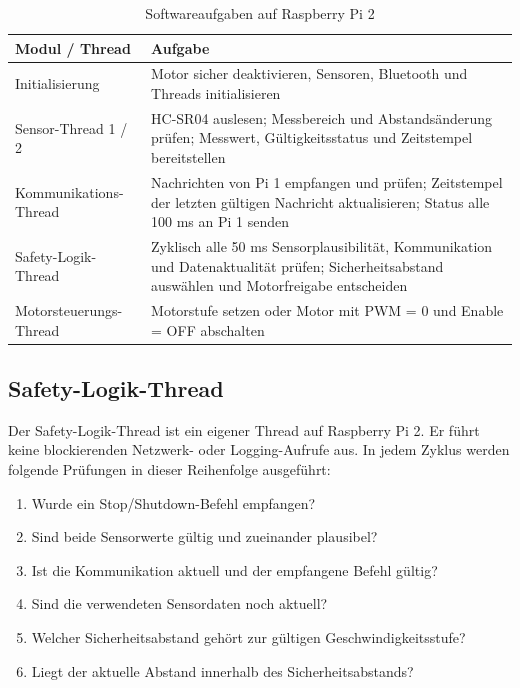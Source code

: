 \begin{table}[H]
    \centering
    \small
    \begin{tabularx}{\textwidth}{@{}p{4.2cm}Y@{}}
        \toprule
        \textbf{Modul / Thread} & \textbf{Aufgabe} \\
        \midrule
        Initialisierung & Motor sicher deaktivieren, Sensoren, Bluetooth und Threads initialisieren \\
        Sensor-Thread 1 / 2 & HC-SR04 auslesen; Messbereich und Abstandsänderung prüfen; Messwert, Gültigkeitsstatus und Zeitstempel bereitstellen \\
        Kommunikations-Thread & Nachrichten von Pi 1 empfangen und prüfen; Zeitstempel der letzten gültigen Nachricht aktualisieren; Status alle 100 ms an Pi 1 senden \\
        Safety-Logik-Thread & Zyklisch alle 50 ms Sensorplausibilität, Kommunikation und Datenaktualität prüfen; Sicherheitsabstand auswählen und Motorfreigabe entscheiden \\
        Motorsteuerungs-Thread & Motorstufe setzen oder Motor mit PWM = 0 und Enable = OFF abschalten \\
        \bottomrule
    \end{tabularx}
    \caption{Softwareaufgaben auf Raspberry Pi 2}
\end{table}

\subsection{Safety-Logik-Thread}

Der Safety-Logik-Thread ist ein eigener Thread auf Raspberry Pi 2. Er führt
keine blockierenden Netzwerk- oder Logging-Aufrufe aus. In jedem Zyklus werden
folgende Prüfungen in dieser Reihenfolge ausgeführt:

\begin{enumerate}
    \item Wurde ein Stop/Shutdown-Befehl empfangen?
    \item Sind beide Sensorwerte gültig und zueinander plausibel?
    \item Ist die Kommunikation aktuell und der empfangene Befehl gültig?
    \item Sind die verwendeten Sensordaten noch aktuell?
    \item Welcher Sicherheitsabstand gehört zur gültigen Geschwindigkeitsstufe?
    \item Liegt der aktuelle Abstand innerhalb des Sicherheitsabstands?
\end{enumerate}

